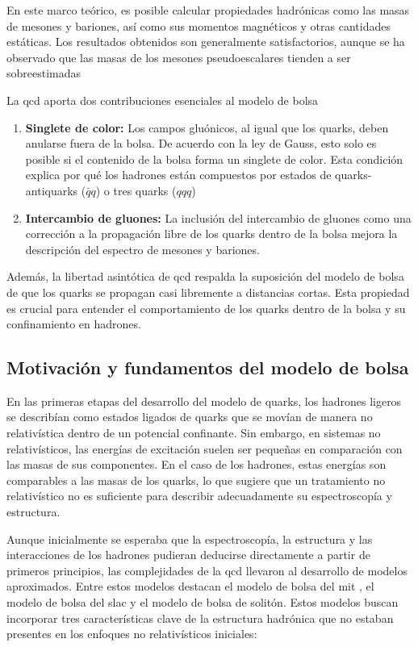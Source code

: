 En este marco teórico, es posible calcular propiedades hadrónicas como las masas de mesones y bariones, así como sus momentos magnéticos y otras cantidades estáticas. Los resultados obtenidos son generalmente satisfactorios, aunque se ha observado que las masas de los mesones pseudoescalares tienden a ser sobreestimadas %

La \acrshort{qcd} aporta dos contribuciones esenciales al modelo de bolsa %

\begin{enumerate}
\item \textbf{Singlete de color:} Los campos gluónicos, al igual que los quarks, deben anularse fuera de la bolsa. De acuerdo con la ley de Gauss, esto solo es posible si el contenido de la bolsa forma un singlete de color. Esta condición explica por qué los hadrones están compuestos por estados de quarks-antiquarks  ($\bar{q}q$) o tres quarks ($qqq$)
\item \textbf{Intercambio de gluones:} La inclusión del intercambio de gluones como una corrección a la propagación libre de los quarks dentro de la bolsa mejora la descripción del espectro de mesones y bariones.
\end{enumerate}

Además, la libertad asintótica de \acrshort{qcd} respalda la suposición del modelo de bolsa de que los quarks se propagan casi libremente a distancias cortas. Esta propiedad es crucial para entender el comportamiento de los quarks dentro de la bolsa y su confinamiento en hadrones.

\subsection{Motivación y fundamentos del modelo de bolsa}

En las primeras etapas del desarrollo del modelo de quarks, los hadrones ligeros se describían como estados ligados de quarks que se movían de manera no relativística dentro de un potencial confinante. Sin embargo, en sistemas no relativísticos, las energías de excitación suelen ser pequeñas en comparación con las masas de sus componentes. En el caso de los hadrones, estas energías son comparables a las masas de los quarks, lo que sugiere que un tratamiento no relativístico no es suficiente para describir adecuadamente su espectroscopía y estructura. %

Aunque inicialmente se esperaba que la espectroscopía, la estructura y las interacciones de los hadrones pudieran deducirse directamente a partir de primeros principios, las complejidades de la \acrshort{qcd} llevaron al desarrollo de modelos aproximados. Entre estos modelos destacan el modelo de bolsa del \acrshort{mit} %
, el modelo de bolsa del \acrfull{slac} y el modelo de bolsa de solitón. Estos modelos buscan incorporar tres características clave de la estructura hadrónica que no estaban presentes en los enfoques no relativísticos iniciales:

